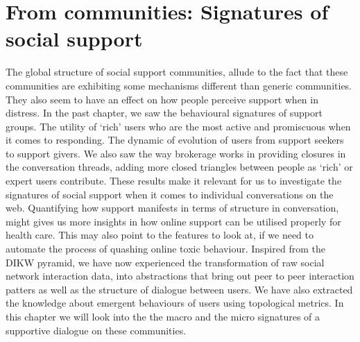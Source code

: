 \chapter{From communities: Signatures of social support}
\label{chap:structure_support}
\makeatletter
{}
\makeatother

\graphicspath{{Chapter3/plots/}{Chapter3/plots/figures/}{Chapter3/plots/Zscore/}}

The global structure of social support communities, allude to the fact that these communities are exhibiting some mechanisms different than generic communities. They also seem to have an effect on how people perceive support when in distress. In the past chapter, we saw the behavioural signatures of support groups. The utility of `rich' users who are the most active and promiscuous when it comes to responding. The dynamic of evolution of users from support seekers to support givers. We also saw the way brokerage works in providing closures in the conversation threads, adding more closed triangles between people as `rich' or expert users contribute. These results make it relevant for us to investigate the signatures of social support when it comes to individual conversations on the web. Quantifying how support manifests in terms of structure in conversation, might gives us more insights in how online support can be utilised properly for health care. This may also point to the features to look at, if we need to automate the process of quashing online toxic behaviour.
Inspired from the DIKW pyramid, we have now experienced the transformation of raw social network interaction data, into abstractions that bring out peer to peer interaction patters as well as the structure of dialogue between users. We have also extracted the knowledge about emergent behaviours of users using topological metrics. In this chapter we will look into the the macro and the micro signatures of a supportive dialogue on these communities.

